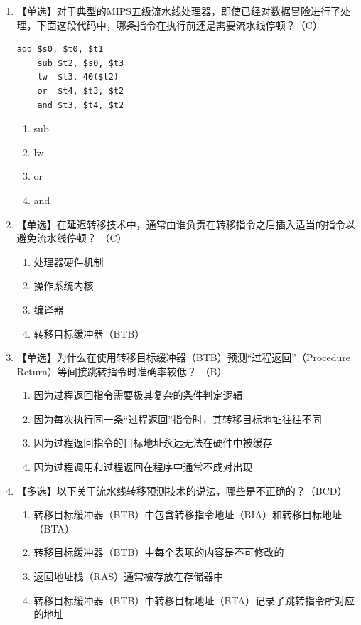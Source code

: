 \documentclass[12pt, a4paper]{article}
\begin{document}
\begin{enumerate}[label=\arabic*.]
    \item 【单选】对于典型的MIPS五级流水线处理器，即使已经对数据冒险进行了处理，下面这段代码中，哪条指令在执行前还是需要流水线停顿？（C）
    \begin{center}
    \begin{BVerbatim}[frame=single, framesep=3mm]
    add $s0, $t0, $t1 
    sub $t2, $s0, $t3 
    lw  $t3, 40($t2) 
    or  $t4, $t3, $t2 
    and $t3, $t4, $t2
    \end{BVerbatim}
    \end{center}
    \begin{enumerate}[label=\Alph*：]
        \item sub \item lw \item or \item and
    \end{enumerate}

    \item 【单选】在延迟转移技术中，通常由谁负责在转移指令之后插入适当的指令以避免流水线停顿？ （C）
    \begin{enumerate}[label=\Alph*：]
        \item 处理器硬件机制 \item 操作系统内核 
        \item 编译器 \item 转移目标缓冲器（BTB） 
    \end{enumerate}

    \item 【单选】为什么在使用转移目标缓冲器（BTB）预测“过程返回”（Procedure Return）等间接跳转指令时准确率较低？ （B）
    \begin{enumerate}[label=\Alph*：]
        \item 因为过程返回指令需要极其复杂的条件判定逻辑 
        \item 因为每次执行同一条“过程返回”指令时，其转移目标地址往往不同 
        \item 因为过程返回指令的目标地址永远无法在硬件中被缓存
        \item 因为过程调用和过程返回在程序中通常不成对出现 
    \end{enumerate}

    \item 【多选】以下关于流水线转移预测技术的说法，哪些是不正确的？（BCD）
    \begin{enumerate}[label=\Alph*：]
        \item 转移目标缓冲器（BTB）中包含转移指令地址（BIA）和转移目标地址（BTA）
        \item 转移目标缓冲器（BTB）中每个表项的内容是不可修改的
        \item 返回地址栈（RAS）通常被存放在存储器中
        \item 转移目标缓冲器（BTB）中转移目标地址（BTA）记录了跳转指令所对应的地址
    \end{enumerate}


\end{enumerate}
\end{document}

